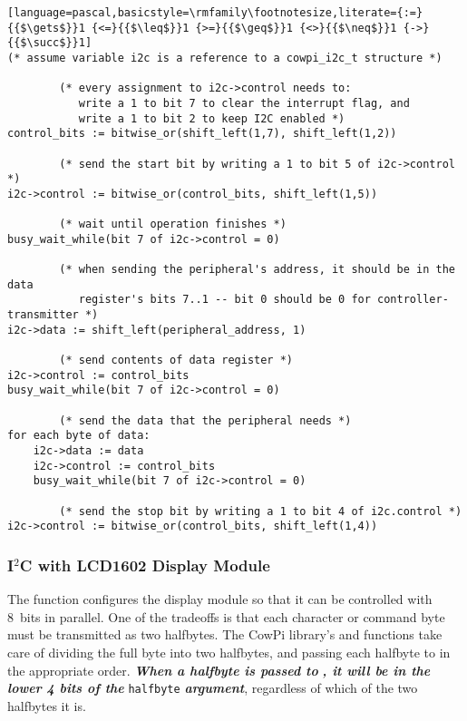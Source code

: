 \begin{lstlisting}[language=pascal,basicstyle=\rmfamily\footnotesize,literate={:=}{{$\gets$}}1 {<=}{{$\leq$}}1 {>=}{{$\geq$}}1 {<>}{{$\neq$}}1 {->}{{$\succ$}}1]
(* assume variable i2c is a reference to a cowpi_i2c_t structure *)

        (* every assignment to i2c->control needs to:
           write a 1 to bit 7 to clear the interrupt flag, and
           write a 1 to bit 2 to keep I2C enabled *)
control_bits := bitwise_or(shift_left(1,7), shift_left(1,2))

        (* send the start bit by writing a 1 to bit 5 of i2c->control *)
i2c->control := bitwise_or(control_bits, shift_left(1,5))

        (* wait until operation finishes *)
busy_wait_while(bit 7 of i2c->control = 0)

        (* when sending the peripheral's address, it should be in the data
           register's bits 7..1 -- bit 0 should be 0 for controller-transmitter *)
i2c->data := shift_left(peripheral_address, 1)

        (* send contents of data register *)
i2c->control := control_bits
busy_wait_while(bit 7 of i2c->control = 0)

        (* send the data that the peripheral needs *)
for each byte of data:
    i2c->data := data
    i2c->control := control_bits
    busy_wait_while(bit 7 of i2c->control = 0)

        (* send the stop bit by writing a 1 to bit 4 of i2c.control *)
i2c->control := bitwise_or(control_bits, shift_left(1,4))
\end{lstlisting}

\subsubsection{I$^2$C with LCD1602 Display Module} \label{subsubsec:send_halfbyte}

The  function configures the display module so that it can be controlled with 8~bits in parallel.
One of the tradeoffs is that each character or command byte must be transmitted as two halfbytes.
The CowPi library's  and  functions take care of dividing the full byte into two halfbytes, and passing each halfbyte to  in the appropriate order.
\textit{\textbf{When a halfbyte is passed to }}\textit{\textbf{, it will be in the lower 4 bits of the }}\lstinline{halfbyte}\textit{\textbf{ argument}}, regardless of which of the two halfbytes it is.

